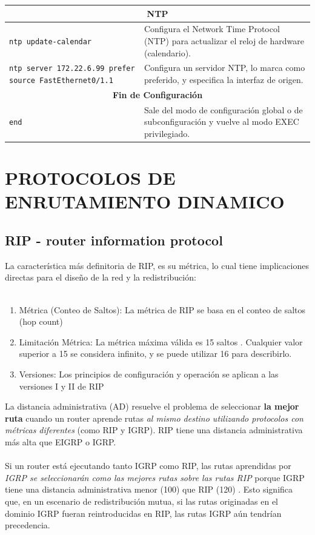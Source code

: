 \documentclass[a5paper]{book}%
\begin{document}
\begin{longtable}{|p{6cm}|p{4cm}|}
\multicolumn{2}{|c|}{\textbf{NTP}}\\\hline
\texttt{ntp update-calendar} & Configura el Network Time Protocol (NTP) para actualizar el reloj de hardware (calendario). \\
\texttt{ntp server 172.22.6.99 prefer source FastEthernet0/1.1} & Configura un servidor NTP, lo marca como preferido, y especifica la interfaz de origen. \\
\multicolumn{2}{|c|}{\textbf{Fin de Configuración}}\\\hline
\texttt{end} & Sale del modo de configuración global o de subconfiguración y vuelve al modo EXEC privilegiado. \\
\hline
\end{longtable}
 
  
  \section{PROTOCOLOS DE ENRUTAMIENTO DINAMICO}
  
  \subsection{RIP - router information protocol}
  La característica más definitoria de RIP, es su métrica, lo cual tiene implicaciones directas para el diseño de la red y la redistribución:\\\\
  
  \begin{enumerate}
  	\item Métrica (Conteo de Saltos): La métrica de RIP se basa en el conteo de saltos (hop count)
  	\item  Limitación Métrica: La métrica máxima válida es 15 saltos
  	. Cualquier valor superior a 15 se considera infinito, y se puede utilizar 16 para describirlo.
  	\item Versiones: Los principios de configuración y operación se aplican a las versiones I y II de RIP
  	
  \end{enumerate}  
  
  La distancia administrativa (AD) resuelve el problema de seleccionar \textbf{la mejor ruta} cuando un router aprende rutas \textit{al mismo destino utilizando protocolos con métricas diferentes} (como RIP y IGRP). RIP tiene una distancia administrativa más alta que EIGRP o IGRP.\\\\Si un router está ejecutando tanto IGRP como RIP, las rutas aprendidas por \textsl{IGRP se seleccionarán como las mejores rutas sobre las rutas RIP} porque IGRP tiene una distancia administrativa menor (100) que RIP (120)
  . Esto significa que, en un escenario de redistribución mutua, si las rutas originadas en el dominio IGRP fueran reintroducidas en RIP, las rutas IGRP aún tendrían precedencia.
  
\end{document}
